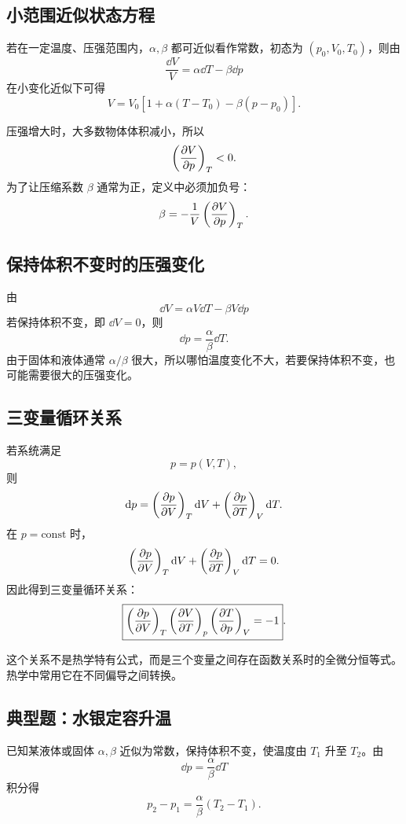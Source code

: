 \subsection{小范围近似状态方程}

若在一定温度、压强范围内，\(\alpha,\beta\) 都可近似看作常数，初态为 \((p_0,V_0,T_0)\)，则由
\[
  \frac{\dd V}{V}=\alpha\dd T-\beta\dd p
\]
在小变化近似下可得
\[
  \boxed{
  V
  =
  V_0\left[
  1+\alpha(T-T_0)-\beta(p-p_0)
  \right]
  }.
\]

\begin{WarnBox}
压强增大时，大多数物体体积减小，所以
\[
  \left(\frac{\partial V}{\partial p}\right)_{T}<0.
\]
为了让压缩系数 \(\beta\) 通常为正，定义中必须加负号：
\[
  \beta=-\frac{1}{V}\left(\frac{\partial V}{\partial p}\right)_{T}.
\]
\end{WarnBox}

\subsection{保持体积不变时的压强变化}

由
\[
  \dd V=\alpha V\dd T-\beta V\dd p
\]
若保持体积不变，即 \(\dd V=0\)，则
\[
  \boxed{
  \dd p=\frac{\alpha}{\beta}\dd T
  }.
\]
由于固体和液体通常 \(\alpha/\beta\) 很大，所以哪怕温度变化不大，若要保持体积不变，也可能需要很大的压强变化。

\subsection{三变量循环关系}

若系统满足
\[
  p=p(V,T),
\]
则
\[
  \mathop{}\!\mathrm{d} p=
  \left(\frac{\partial p}{\partial V}\right)_{T}\mathop{}\!\mathrm{d} V+
  \left(\frac{\partial p}{\partial T}\right)_{V}\mathop{}\!\mathrm{d} T.
\]
在 \(p=\mathrm{const}\) 时，
\[
  \left(\frac{\partial p}{\partial V}\right)_{T}\mathop{}\!\mathrm{d} V+
  \left(\frac{\partial p}{\partial T}\right)_{V}\mathop{}\!\mathrm{d} T=0.
\]
因此得到三变量循环关系：
\[
  \boxed{
  \left(\frac{\partial p}{\partial V}\right)_{T}
  \left(\frac{\partial V}{\partial T}\right)_{p}
  \left(\frac{\partial T}{\partial p}\right)_{V}
  =
  -1
  }.
\]

这个关系不是热学特有公式，而是三个变量之间存在函数关系时的全微分恒等式。热学中常用它在不同偏导之间转换。

\subsection{典型题：水银定容升温}

\begin{MethodBox}
已知某液体或固体 \(\alpha,\beta\) 近似为常数，保持体积不变，使温度由 \(T_1\) 升至 \(T_2\)。由
\[
  \dd p=\frac{\alpha}{\beta}\dd T
\]
积分得
\[
  \boxed{
  p_2-p_1=\frac{\alpha}{\beta}(T_2-T_1)
  }.
\]
\end{MethodBox}


